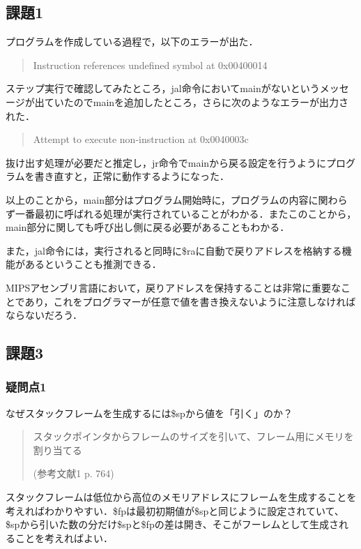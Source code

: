 \documentclass[a4j]{jarticle}
\begin{document}
\subsection{課題1}

プログラムを作成している過程で，以下のエラーが出た．

\begin{quote}
Instruction references undefined symbol at 0x00400014
\end{quote}

ステップ実行で確認してみたところ，jal命令においてmainがないというメッセージが出ていたのでmainを追加したところ，さらに次のようなエラーが出力された．

\begin{quote}
Attempt to execute non-instruction at 0x0040003c
\end{quote}

抜け出す処理が必要だと推定し，jr命令でmainから戻る設定を行うようにプログラムを書き直すと，正常に動作するようになった．

以上のことから，main部分はプログラム開始時に，プログラムの内容に関わらず一番最初に呼ばれる処理が実行されていることがわかる．またこのことから，main部分に関しても呼び出し側に戻る必要があることもわかる．

また，jal命令には，実行されると同時に\$raに自動で戻りアドレスを格納する機能があるということも推測できる．

MIPSアセンブリ言語において，戻りアドレスを保持することは非常に重要なことであり，これをプログラマーが任意で値を書き換えないように注意しなければならないだろう．




\subsection{課題3}

\subsubsection{疑問点1}

なぜスタックフレームを生成するには\$spから値を「引く」のか？

\begin{quote}
スタックポインタからフレームのサイズを引いて、フレーム用にメモリを割り当てる 

(参考文献1 p. 764)
\end{quote}

スタックフレームは低位から高位のメモリアドレスにフレームを生成することを考えればわかりやすい．\$fpは最初初期値が\$spと同じように設定されていて、\$spから引いた数の分だけ\$spと\$fpの差は開き、そこがフーレムとして生成されることを考えればよい．
\end{document}
